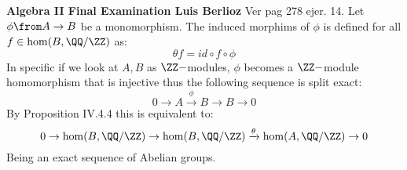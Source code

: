 \noindent\textbf{Algebra II Final Examination \hspace{\fill} Luis Berlioz}
Ver pag 278 ejer. 14.
Let $\phi \from A\to B$ be a monomorphism. The induced morphims of $\phi$ is defined for all $f\in \hom(B,\QQ/\ZZ)$ as: 
$$\theta f= id\circ f\circ \phi$$
In specific if we look at $A,B$ as $\ZZ-$modules,  $\phi$ becomes a $\ZZ-$module homomorphism that is injective thus the following sequence is split exact:
$$0\to A \xrightarrow \phi B \to B \to 0$$
By Proposition IV.4.4 this is equivalent to:
$$0\to \hom(B,\QQ/\ZZ) \to \hom(B,\QQ/\ZZ) \xrightarrow \theta \hom(A,\QQ/\ZZ) \to 0$$
Being an exact sequence of Abelian groups.

